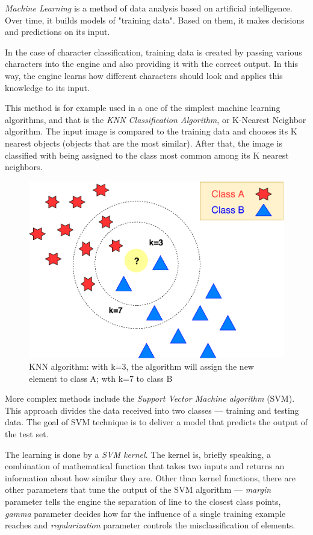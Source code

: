 \emph{Machine Learning} \citep{sebastiani2002machine} is a method of data analysis based on artificial intelligence. Over time, it builds models of "training data". Based on them, it makes decisions and predictions on its input. 

In the case of character classification, training data is created by passing various characters into the engine and also providing it with the correct output. In this way, the engine learns how different characters should look and applies this knowledge to its input.

This method is for example used in a one of the simplest machine learning algorithms, and that is the \emph{KNN Classification Algorithm}, or K-Nearest Neighbor algorithm. The input image is compared to the training data and chooses its K nearest objects (objects that are the most similar). After that, the image is classified with being assigned to the class most common among its K nearest neighbors.

\begin{figure}[t]
\centering
\includegraphics[width=0.7\linewidth]{img/characterClassification/knn.pdf}
\caption{KNN algorithm: with k=3, the algorithm will assign the new element to class A; wth k=7 to class B } \label{fig:1a}
\end{figure}

More complex methods include the \emph{Support Vector Machine algorithm} (SVM). This approach divides the data received into two classes --- training and testing data. The goal of SVM technique is to deliver a model that predicts the output of the test set.

The learning is done by a \emph{SVM kernel}. The kernel is, briefly speaking, a combination of mathematical function that takes two inputs and returns an information about how similar they are. Other than kernel functions, there are other parameters that tune the output of the SVM algorithm --- \emph{margin} parameter tells the engine the separation of line to the closest class points, \emph{gamma} parameter decides how far the influence of a single training example reaches and \emph{regularization} parameter controls the misclassification of elements.

